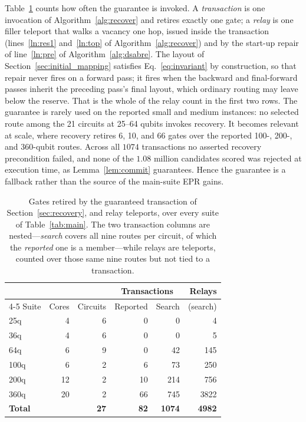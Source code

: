 \documentclass[journal]{IEEEtran}
\begin{document}
\label{sec:tier2}Table~\ref{tab:tier2} counts how often the guarantee is invoked.  A \emph{transaction} is one invocation of Algorithm~\ref{alg:recover} and retires exactly one gate; a \emph{relay} is one filler teleport that walks a vacancy one hop, issued inside the transaction (lines~\ref{ln:res1} and~\ref{ln:top} of Algorithm~\ref{alg:recover}) and by the start-up repair of line~\ref{ln:pre} of Algorithm~\ref{alg:dsabre}.  The layout of Section~\ref{sec:initial_mapping} satisfies Eq.~\eqref{eq:invariant} by construction, so that repair never fires on a forward pass; it fires when the backward and final-forward passes inherit the preceding pass's final layout, which ordinary routing may leave below the reserve.  That is the whole of the relay count in the first two rows.  The guarantee is rarely used on the reported small and medium instances: no selected route among the 21 circuits at 25--64 qubits invokes recovery.  It becomes relevant at scale, where recovery retires 6, 10, and 66 gates over the reported 100-, 200-, and 360-qubit routes.  Across all $1074$ transactions no asserted recovery precondition failed, and none of the $1.08$ million candidates scored was rejected at execution time, as Lemma~\ref{lem:commit} guarantees.  Hence the guarantee is a fallback rather than the source of the main-suite EPR gains.

\begin{table}[t]
\centering
\caption{Gates retired by the guaranteed transaction of
  Section~\ref{sec:recovery}, and relay teleports, over every suite of
  Table~\ref{tab:main}.  The two transaction columns are nested---\emph{search} covers all
  nine routes per circuit, of which the \emph{reported} one is a member---while
  relays are teleports, counted over those same nine routes but not tied to a
  transaction.}
\label{tab:tier2}
\small
\begin{tabular}{@{}lrrrrr@{}}
\toprule
      &       &           & \multicolumn{2}{c}{Transactions} & Relays \\
\cmidrule(lr){4-5}
Suite & Cores & Circuits & Reported & Search & (search) \\
\midrule
25q  &  4 & 6 &  0 &    0 &    4 \\
36q  &  4 & 6 &  0 &    0 &    5 \\
64q  &  6 & 9 &  0 &   42 &  145 \\
100q &  6 & 2 &  6 &   73 &  250 \\
200q & 12 & 2 & 10 &  214 &  756 \\
360q & 20 & 2 & 66 &  745 & 3822 \\
\midrule
\textbf{Total} & & \textbf{27} & \textbf{82} & \textbf{1074} & \textbf{4982} \\
\bottomrule
\end{tabular}
\end{table}
\end{document}
